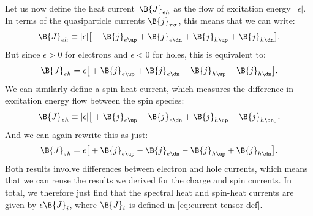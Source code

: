 Let us now define the heat current~$\B{J}_{eh}$ as the flow of excitation energy~$|\epsilon|$.
In terms of the quasiparticle currents $\B{j}_{\tau\sigma}$, this means that we can write:
\begin{equation}
  \B{J}_{eh} \equiv |\epsilon| \big[ +\B{j}_{e\up} + \B{j}_{e\dn} + \B{j}_{h\up} + \B{j}_{h\dn} \big].
\end{equation}
But since $\epsilon > 0$ for electrons and $\epsilon < 0$ for holes, this is equivalent to:
\begin{equation}
  \B{J}_{eh} = \epsilon \big[ +\B{j}_{e\up} + \B{j}_{e\dn} - \B{j}_{h\up} - \B{j}_{h\dn} \big].
\end{equation}
We can similarly define a spin-heat current, which measures the difference in excitation energy flow between the spin species:
\begin{equation}
  \B{J}_{zh} \equiv |\epsilon| \big[ +\B{j}_{e\up} - \B{j}_{e\dn} + \B{j}_{h\up} - \B{j}_{h\dn} \big].
\end{equation}
And we can again rewrite this as just:
\begin{equation}
  \B{J}_{zh} = \epsilon \big[ +\B{j}_{e\up} - \B{j}_{e\dn} - \B{j}_{h\up} + \B{j}_{h\dn} \big].
\end{equation}
Both results involve differences between electron and hole currents, which means that we can reuse the results we derived for the charge and spin currents.
In total, we therefore just find that the spectral heat and spin-heat currents are given by $\epsilon\B{J}_i$, where $\B{J}_i$ is defined in \cref{eq:current-tensor-def}.



